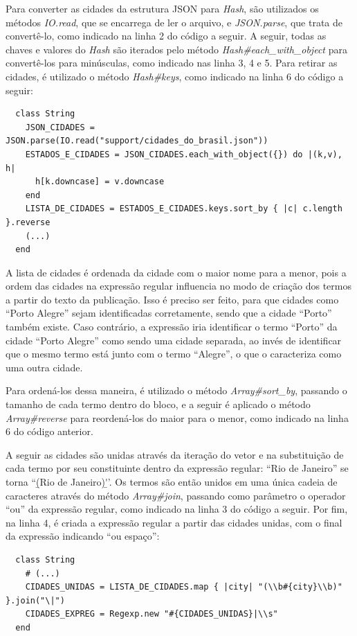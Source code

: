 Para converter as cidades da estrutura JSON para \textit{Hash}, são utilizados os métodos \textit{IO.read}, que se encarrega de ler o arquivo, e \textit{JSON.parse}, que trata de convertê-lo, como indicado na linha 2 do código a seguir. A seguir, todas as chaves e valores do \textit{Hash} são iterados pelo método \textit{Hash\#each\_with\_object} para convertê-los para minúsculas, como indicado nas linha 3, 4 e 5. Para retirar as cidades, é utilizado o método \textit{Hash\#keys}, como indicado na linha 6 do código a seguir:

\begin{lstlisting}
  class String
    JSON_CIDADES = JSON.parse(IO.read("support/cidades_do_brasil.json"))
    ESTADOS_E_CIDADES = JSON_CIDADES.each_with_object({}) do |(k,v), h|
      h[k.downcase] = v.downcase
    end
    LISTA_DE_CIDADES = ESTADOS_E_CIDADES.keys.sort_by { |c| c.length }.reverse
    (...)
  end
\end{lstlisting}

A lista de cidades é ordenada da cidade com o maior nome para a menor, pois a ordem das cidades na expressão regular influencia no modo de criação dos termos a partir do texto da publicação. Isso é preciso ser feito, para que cidades como ``Porto Alegre'' sejam identificadas corretamente, sendo que a cidade ``Porto'' também existe. Caso contrário, a expressão iria identificar o termo ``Porto'' da cidade ``Porto Alegre'' como sendo uma cidade separada, ao invés de identificar que o mesmo termo está junto com o termo ``Alegre'', o que o caracteriza como uma outra cidade.

Para ordená-los dessa maneira, é utilizado o método \textit{Array\#sort\_by}, passando o tamanho de cada termo dentro do bloco, e a seguir é aplicado o método \textit{Array\#reverse} para reordená-los do maior para o menor, como indicado na linha 6 do código anterior.

A seguir as cidades são unidas através da iteração do vetor e na substituição de cada termo por seu constituinte dentro da expressão regular: ``Rio de Janeiro'' se torna ``\b(Rio de Janeiro)\b''. Os termos são então unidos em uma única cadeia de caracteres através do método \textit{Array\#join}, passando como parâmetro o operador ``ou'' da expressão regular, como indicado na linha 3 do código a seguir. Por fim, na linha 4, é criada a expressão regular a partir das cidades unidas, com o final da expressão indicando ``ou espaço'':

\begin{lstlisting}
  class String
    # (...)
    CIDADES_UNIDAS = LISTA_DE_CIDADES.map { |city| "(\\b#{city}\\b)" }.join("\|")
    CIDADES_EXPREG = Regexp.new "#{CIDADES_UNIDAS}|\\s"
  end
\end{lstlisting}

